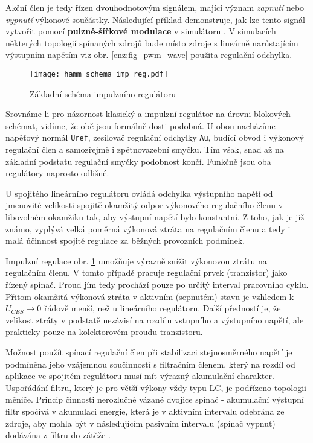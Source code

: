     Akční člen je tedy řízen dvouhodnotovým signálem, mající význam \emph{zapnutí} nebo 
    \emph{vypnutí} výkonové součástky. Následující příklad demonstruje, jak lze tento signál 
    vytvořit pomocí \textbf{pulzně-šířkové modulace} v simulátoru \ltLtspiceSW. V simulacích 
    některých topologií spínaných zdrojů bude místo zdroje s lineárně narůstajícím výstupním 
    napětím viz obr. \ref{enz:fig_pwm_wave} použita regulační odchylka.
    
    \begin{figure}[ht!]
      \centering
      \texttt{[image: hamm\_schema\_imp\_reg.pdf]}
      \caption[Schéma impulzního regulátoru]{Základní schéma impulzního regulátoru}
      \label{enz:fig_imp_reg_basic}
    \end{figure}
    
    Srovnáme-li pro názornost klasický a impulzní regulátor na úrovni blokových schémat, vidíme, že 
    obě jsou formálně dosti podobná. U obou nacházíme napěťový normál \texttt{Uref}, zesilovač 
    regulační odchylky \texttt{Au}, budící obvod i výkonový regulační člen a samozřejmě i 
    zpětnovazební smyčku. Tím však, snad až na základní podstatu regulační smyčky podobnost končí. 
    Funkčně jsou oba regulátory naprosto odlišné.
    
    U spojitého lineárního regulátoru ovládá odchylka výstupního napětí od jmenovité velikosti 
    spojitě okamžitý odpor výkonového regulačního členu v libovolném o\-kam\-ži\-ku tak, aby 
    výstupní napětí bylo konstantní. Z toho, jak je již známo, vyplývá velká poměrná výkonová 
    ztráta na regulačním členu a tedy i malá účinnost spojité regulace za běžných provozních 
    podmínek.
    
    Impulzní regulace obr. \ref{enz:fig_imp_reg_basic} umožňuje výrazně snížit výkonovou ztrátu na
    regulačním členu. V tomto případě pracuje regulační prvek (tranzistor) jako řízený spínač. 
    Proud jím tedy prochází pouze po určitý interval pracovního cyklu. Přitom okamžitá výkonová 
    ztráta v aktivním (sepnutém) stavu je vzhledem k $U_{CES}\rightarrow 0$ řádově menší, než u 
    lineárního regulátoru. Další předností je, že velikost ztráty v podstatě nezávisí na rozdílu 
    vstupního a výstupního napětí, ale prakticky pouze na kolektorovém proudu tranzistoru.
    
    Možnost použít spínací regulační člen při stabilizaci stejnosměrného napětí je podmíněna jeho 
    vzájemnou součinností s filtračním členem, který na rozdíl od aplikace ve spojitém regulátoru 
    musí mít výrazný akumulační charakter. Uspořádání filtru, který je pro větší výkony vždy typu 
    LC, je podřízeno topologii měniče. Princip činnosti nerozlučně vázané dvojice spínač - 
    akumulační výstupní filtr spočívá v akumulaci energie, která je v aktivním intervalu odebrána 
    ze zdroje, aby mohla být v následujícím pasivním intervalu (spínač vypnut) dodávána z filtru do 
    zátěže \cite[s.~121]{Hammembauer}.
           
